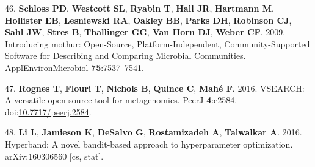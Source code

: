 \documentclass[11pt,]{article}
\begin{document}
\hypertarget{ref-schloss_introducing_2009}{}
46. \textbf{Schloss PD}, \textbf{Westcott SL}, \textbf{Ryabin T},
\textbf{Hall JR}, \textbf{Hartmann M}, \textbf{Hollister EB},
\textbf{Lesniewski RA}, \textbf{Oakley BB}, \textbf{Parks DH},
\textbf{Robinson CJ}, \textbf{Sahl JW}, \textbf{Stres B},
\textbf{Thallinger GG}, \textbf{Van Horn DJ}, \textbf{Weber CF}. 2009.
Introducing mothur: Open-Source, Platform-Independent,
Community-Supported Software for Describing and Comparing Microbial
Communities. ApplEnvironMicrobiol \textbf{75}:7537--7541.

\hypertarget{ref-rognes_vsearch_2016}{}
47. \textbf{Rognes T}, \textbf{Flouri T}, \textbf{Nichols B},
\textbf{Quince C}, \textbf{Mahé F}. 2016. VSEARCH: A versatile open
source tool for metagenomics. PeerJ \textbf{4}:e2584.
doi:\href{https://doi.org/10.7717/peerj.2584}{10.7717/peerj.2584}.

\hypertarget{ref-li_hyperband:_2016}{}
48. \textbf{Li L}, \textbf{Jamieson K}, \textbf{DeSalvo G},
\textbf{Rostamizadeh A}, \textbf{Talwalkar A}. 2016. Hyperband: A novel
bandit-based approach to hyperparameter optimization. arXiv:160306560
{[}cs, stat{]}.

\newpage

\captionsetup{labelformat=empty}
\small
\end{document}
